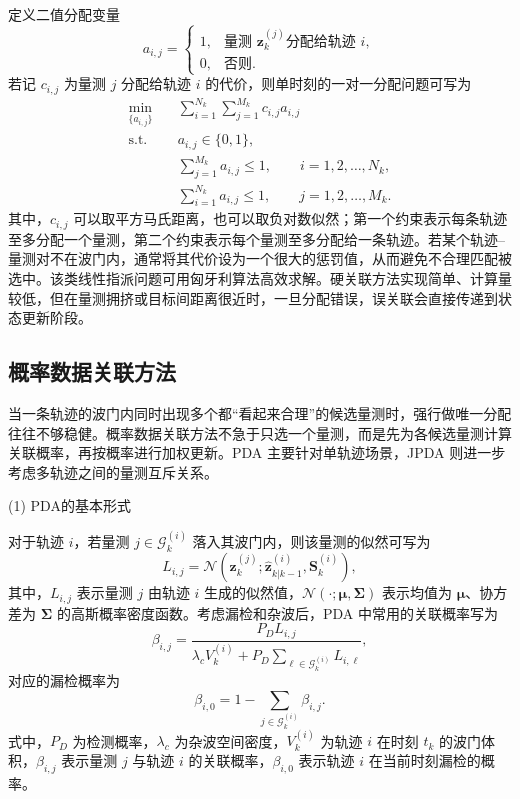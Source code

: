 \documentclass{xdupgthesis}
\begin{document}
定义二值分配变量
\begin{equation}
	a_{i,j}=
	\begin{cases}
		1, & \text{量测 } \mathbf{z}^{(j)}_k \text{分配给轨迹 } i,\\
		0, & \text{否则}.
	\end{cases}
\end{equation}
若记 $c_{i,j}$ 为量测 $j$ 分配给轨迹 $i$ 的代价，则单时刻的一对一分配问题可写为
\begin{align}
	\min_{\{a_{i,j}\}}\quad
	& \sum_{i=1}^{N_k}\sum_{j=1}^{M_k} c_{i,j}a_{i,j} \\
	\text{s.t.}\quad
	& a_{i,j}\in\{0,1\}, \\
	& \sum_{j=1}^{M_k} a_{i,j}\le 1,\qquad i=1,2,\ldots,N_k, \\
	& \sum_{i=1}^{N_k} a_{i,j}\le 1,\qquad j=1,2,\ldots,M_k.
\end{align}
其中，$c_{i,j}$ 可以取平方马氏距离，也可以取负对数似然；第一个约束表示每条轨迹至多分配一个量测，第二个约束表示每个量测至多分配给一条轨迹。若某个轨迹--量测对不在波门内，通常将其代价设为一个很大的惩罚值，从而避免不合理匹配被选中。该类线性指派问题可用匈牙利算法高效求解\cite{kuhn1955hungarian}。硬关联方法实现简单、计算量较低，但在量测拥挤或目标间距离很近时，一旦分配错误，误关联会直接传递到状态更新阶段。

\subsection{概率数据关联方法}

当一条轨迹的波门内同时出现多个都“看起来合理”的候选量测时，强行做唯一分配往往不够稳健。概率数据关联方法不急于只选一个量测，而是先为各候选量测计算关联概率，再按概率进行加权更新。PDA 主要针对单轨迹场景，JPDA 则进一步考虑多轨迹之间的量测互斥关系\cite{barshalom1975pda,fortmann1983jpda}。


\textnormal{(1) PDA的基本形式}\par\vspace{0.3\baselineskip}

对于轨迹 $i$，若量测 $j\in\mathcal{G}^{(i)}_k$ 落入其波门内，则该量测的似然可写为
\begin{equation}
	L_{i,j}
	=
	\mathcal{N}\!\left(
	\mathbf{z}^{(j)}_k;
	\hat{\mathbf{z}}^{(i)}_{k|k-1},
	\mathbf{S}^{(i)}_k
	\right),
\end{equation}
其中，$L_{i,j}$ 表示量测 $j$ 由轨迹 $i$ 生成的似然值，$\mathcal{N}(\cdot;\boldsymbol{\mu},\mathbf{\Sigma})$ 表示均值为 $\boldsymbol{\mu}$、协方差为 $\mathbf{\Sigma}$ 的高斯概率密度函数。考虑漏检和杂波后，PDA 中常用的关联概率写为
\begin{equation}
	\beta_{i,j}
	=
	\frac{P_D L_{i,j}}
	{\lambda_c V_k^{(i)}+P_D\sum\limits_{\ell\in\mathcal{G}^{(i)}_k}L_{i,\ell}},
\end{equation}
对应的漏检概率为
\begin{equation}
	\beta_{i,0}
	=
	1-\sum_{j\in\mathcal{G}^{(i)}_k}\beta_{i,j}.
\end{equation}
式中，$P_D$ 为检测概率，$\lambda_c$ 为杂波空间密度，$V_k^{(i)}$ 为轨迹 $i$ 在时刻 $t_k$ 的波门体积，$\beta_{i,j}$ 表示量测 $j$ 与轨迹 $i$ 的关联概率，$\beta_{i,0}$ 表示轨迹 $i$ 在当前时刻漏检的概率。
\end{document}
